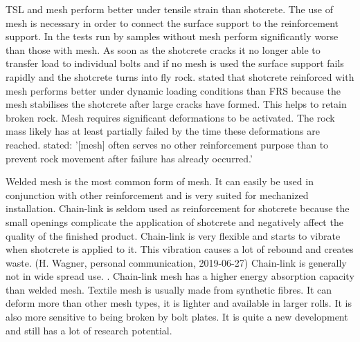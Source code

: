 TSL and mesh perform better under tensile strain than shotcrete. \autocite[3]{Villa14}
The use of mesh is necessary in order to connect the surface support to the reinforcement support. In the tests run by \textcite{Heal10} samples without mesh perform significantly worse than those with mesh. As soon as the shotcrete cracks it no longer able to transfer load to individual bolts and if no mesh is used the surface support fails rapidly and the shotcrete turns into fly rock. \autocite[214]{Heal10} \textcite[124]{ansell05} stated that shotcrete reinforced with mesh performs better under dynamic loading conditions than FRS because the mesh stabilises the shotcrete after large cracks have formed. This helps to retain broken rock. Mesh requires significant deformations to be activated. The rock mass likely has at least partially failed by the time these deformations are reached. \textcite[1]{archibald97} stated: '[mesh] often serves no other reinforcement purpose than to prevent rock movement after failure has already occurred.'

Welded mesh is the most common form of mesh. It can easily be used in conjunction with other reinforcement and is very suited for mechanized installation. \autocite[574]{sme11}
Chain-link is seldom used as reinforcement for shotcrete because the small openings complicate the application of shotcrete and negatively affect the quality of the finished product. \autocite[344]{Brady99} Chain-link is very flexible and starts to vibrate when shotcrete is applied to it. This vibration causes a lot of rebound and creates waste. (H. Wagner, personal communication, 2019-06-27) 
Chain-link is generally not in wide spread use. \autocite{sme11}. Chain-link mesh has a higher energy absorption capacity than welded mesh. \autocite{Potvin10} \autocite{canada96} \autocite[575]{sme11}
Textile mesh is usually made from synthetic fibres. It can deform more than other mesh types, it is lighter and available in larger rolls. It is also more sensitive to being broken by bolt plates. \autocite[13]{minegrid} It is quite a new development and still has a lot of research potential. 

